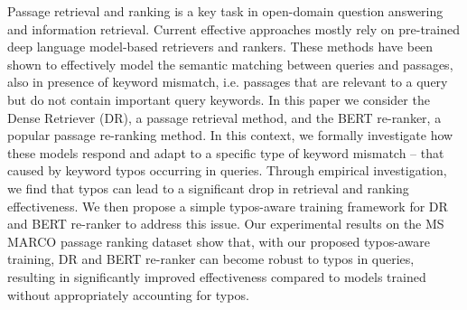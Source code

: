 Passage retrieval and ranking is a key task in open-domain question answering and information retrieval. Current effective approaches mostly rely on pre-trained deep language model-based retrievers and rankers. These methods have been shown to effectively model the semantic matching between queries and passages, also in presence of keyword mismatch, i.e. passages that are relevant to a query but do not contain important query keywords. In this paper we consider the Dense Retriever (DR), a passage retrieval method, and the BERT re-ranker, a popular passage re-ranking method. In this context, we formally investigate how these models respond and adapt to a specific type of keyword mismatch -- that caused by keyword typos occurring in queries. Through empirical investigation, we find that typos can lead to a significant drop in retrieval and ranking effectiveness. We then propose a simple typos-aware training framework for DR and BERT re-ranker to address this issue. Our experimental results on the MS MARCO passage ranking dataset show that, with our proposed typos-aware training, DR and BERT re-ranker can become robust to typos in queries, resulting in significantly improved effectiveness compared to models trained without appropriately accounting for typos.
